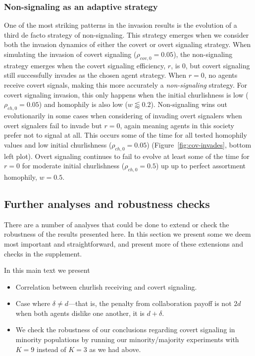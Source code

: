 \documentclass[11pt,letterpaper]{article}
\begin{document}
\subsubsection{Non-signaling as an adaptive strategy}

One of the most striking patterns in the invasion results is the evolution
of a third de facto strategy of non-signaling. This strategy emerges when
we consider both the invasion dynamics of either the covert or overt 
signaling strategy. When simulating the invasion of covert signaling
($\rho_{cov,0}=0.05$), the non-signaling strategy emerges when the covert
signaling efficiency, $r$, is 0, but covert signaling still successfully
invades as the chosen agent strategy. When $r=0$, no agents receive
covert signals, making this more accurately a \emph{non-signaling} strategy.  
For covert signaling invasion, this only happens when the initial churlishness
is low ($\rho_{ch,0}=0.05$) and homophily is also low ($w \lessapprox 0.2$). 
Non-signaling wins out evolutionarily 
in some cases when considering of invading overt signalers when overt signalers
fail to invade but $r=0$, again meaning agents in this society prefer not
to signal at all. This occurs some of the time for all tested homophily
values and low initial churlishness ($\rho_{ch,0}=0.05$) (Figure~\ref{fig:cov-invades}, bottom left plot).  
Overt signaling continues to fail to evolve at least some of the time
for $r=0$ for moderate initial churlishness ($\rho_{ch,0}=0.5$) up up to perfect 
assortment homophily, $w=0.5$.

\subsection{Further analyses and robustness checks}

There are a number of analyses that could be done to extend or check the 
robustness of the results presented here. In this section we present some
we deem most important and straightforward, and present more of these extensions
and checks in the supplement.

In this main text we present
\begin{itemize}
  \item Correlation between churlish receiving and covert signaling.
  \item Case where $\delta \neq d$---that is, the penalty from collaboration
    payoff is not $2d$ when both agents dislike one another, it is $d + \delta$.
  \item We check the robustness of our conclusions regarding covert signaling
    in minority populations by running our minority/majority
    experiments with $K=9$ instead of $K=3$ as we had above.
\end{itemize}
\end{document}
